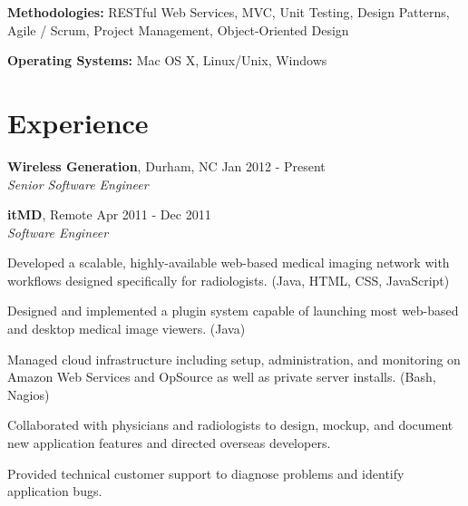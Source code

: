 \documentclass[margin,line]{resume}
\begin{document}
\begin{resume}
  \textbf{Methodologies:} RESTful Web Services, MVC, Unit Testing,
  Design Patterns, Agile / Scrum, Project Management, Object-Oriented
  Design
	\vspace{-2mm}

  \textbf{Operating Systems:} Mac OS X, Linux/Unix, Windows



  \section{\mysidestyle \textcolor{mySideColor}{Experience}}

  \textbf{Wireless Generation}, Durham, NC \hfill Jan 2012 - Present\vspace{1mm}\\
  \textsl{Senior Software Engineer}\\
  \vspace{-3mm}
  \begin{list2}
  \item
  \end{list2}

  \textbf{itMD}, Remote \hfill Apr 2011 - Dec 2011\vspace{1mm}\\
  \textsl{Software Engineer}\\
  \vspace{-3mm}
  \begin{list2}
  \item Developed a scalable, highly-available web-based medical
    imaging network with workflows designed specifically for
    radiologists. (Java, HTML, CSS, JavaScript)
  \item Designed and implemented a plugin system capable of launching
    most web-based and desktop medical image viewers. (Java)
  \item Managed cloud infrastructure including setup, administration,
    and monitoring on Amazon Web Services and OpSource as well as
    private server installs. (Bash, Nagios)
  \item Collaborated with physicians and radiologists to design,
    mockup, and document new application features and directed
    overseas developers.
  \item Provided technical customer support to diagnose problems and
    identify application bugs.
  \end{list2}


\end{resume}
\end{document}
